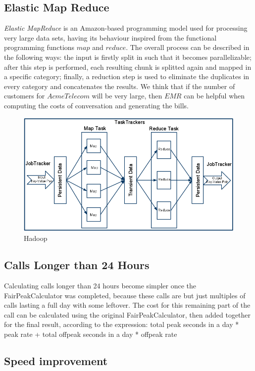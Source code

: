 \documentclass[11pt,twocolumn]{article} %
\begin{document}
\subsection{Elastic Map Reduce}
\emph{Elastic MapReduce} is an Amazon-based programming model used for processing very large data sets, having its behaviour inspired from the functional programming functions $map$ and $reduce$. The overall process can be described in the following ways: the input is firstly split in such that it becomes parallelizable; after this step is performed, each resulting chunk is splitted again and mapped in a specific category; finally, a reduction step is used to eliminate the duplicates in every category and concatenates the results. We think that if the number of customers for $AcmeTelecom$ will be very large, then $EMR$ can be helpful when computing the costs of conversation and generating the bills.
\begin{figure}[ht]
\includegraphics[scale=0.25]{hadoop.png}
\caption{Hadoop \cite{hadoop}}
\end{figure}


\subsection{Calls Longer than 24 Hours}
Calculating calls longer than 24 hours become simpler once the FairPeakCalculator was
completed, because these calls are but just multiples of calls lasting a full day with some
leftover. The cost for this remaining part of the call can be calculated using the original
FairPeakCalculator, then added together for the final result, according to the expression:
total peak seconds in a day * peak rate + total offpeak seconds in a day * offpeak rate

\subsection{Speed improvement}
\end{document}
